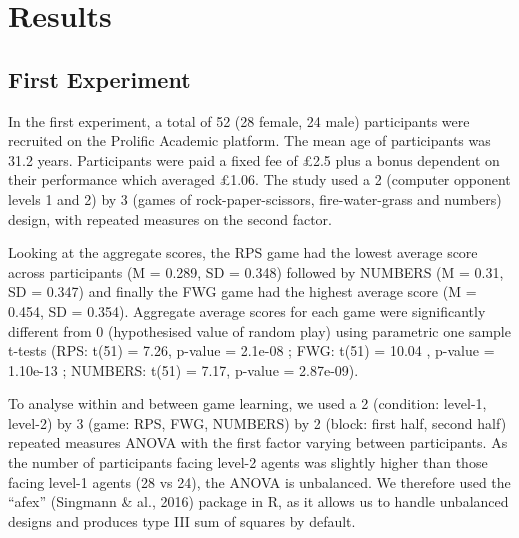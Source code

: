 \documentclass[man,floatsintext]{apa6}
\begin{document}
\newpage

\hypertarget{results}{%
\section{Results}\label{results}}

\hypertarget{first-experiment-1}{%
\subsection{First Experiment}\label{first-experiment-1}}

In the first experiment, a total of 52 (28 female, 24 male) participants were recruited on the Prolific Academic platform. The mean age of participants was 31.2 years. Participants were paid a fixed fee of £2.5 plus a bonus dependent on their performance which averaged £1.06. The study used a 2 (computer opponent levels 1 and 2) by 3 (games of rock-paper-scissors, fire-water-grass and numbers) design, with repeated measures on the second factor.

Looking at the aggregate scores, the RPS game had the lowest average score across participants (M = 0.289, SD = 0.348) followed by NUMBERS (M = 0.31, SD = 0.347) and finally the FWG game had the highest average score (M = 0.454, SD = 0.354). Aggregate average scores for each game were significantly different from 0 (hypothesised value of random play) using parametric one sample t-tests (RPS: t(51) = 7.26, p-value = 2.1e-08 ; FWG: t(51) = 10.04 , p-value = 1.10e-13 ; NUMBERS: t(51) = 7.17, p-value = 2.87e-09).

To analyse within and between game learning, we used a 2 (condition: level-1, level-2) by 3 (game: RPS, FWG, NUMBERS) by 2 (block: first half, second half) repeated measures ANOVA with the first factor varying between participants. As the number of participants facing level-2 agents was slightly higher than those facing level-1 agents (28 vs 24), the ANOVA is unbalanced. We therefore used the ``afex'' (Singmann \& al., 2016) package in R, as it allows us to handle unbalanced designs and produces type III sum of squares by default.
\end{document}
